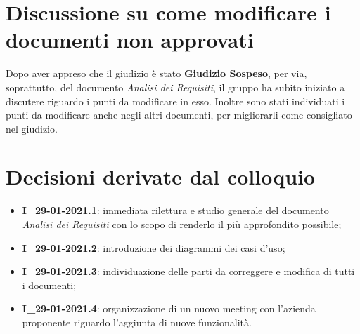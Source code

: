 \section{Discussione su come modificare i documenti non approvati}
Dopo aver appreso che il giudizio è stato \textbf{Giudizio Sospeso}, per via, soprattutto, del documento \textit{Analisi dei Requisiti}, il gruppo ha subito iniziato a discutere riguardo i punti da modificare in esso.
Inoltre sono stati individuati i punti da modificare anche negli altri documenti, per migliorarli come consigliato nel giudizio.


\section{Decisioni derivate dal colloquio}
  \begin{itemize}
    \item \textbf{I\_29-01-2021.1}: immediata rilettura e studio generale del documento \textit{Analisi dei Requisiti} con lo scopo di renderlo il più approfondito possibile;
    \item \textbf{I\_29-01-2021.2}: introduzione dei diagrammi dei casi d'uso;
    \item \textbf{I\_29-01-2021.3}: individuazione delle parti da correggere e modifica di tutti i documenti;
    \item \textbf{I\_29-01-2021.4}: organizzazione di un nuovo meeting con l'azienda proponente riguardo l'aggiunta di nuove funzionalità.
  \end{itemize}
